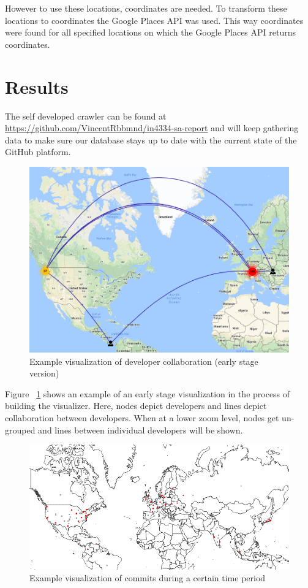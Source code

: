\documentclass[acmtog, authorversion]{acmart}
\begin{document}
However to use these locations, coordinates are needed. 
To transform these locations to coordinates the Google Places API was used. 
This way coordinates were found for all specified locations on which the Google Places API returns coordinates.

\section{Results}
The self developed crawler can be found at \url{https://github.com/VincentRbbmnd/in4334-sa-report} and will keep gathering data to make sure our database stays up to date with the current state of the GitHub platform.

\begin{figure}
\includegraphics[scale=0.3]{visualizer-example.PNG} 
\caption{Example visualization of developer collaboration (early stage version)}
\label{fig:collaboration}
\end{figure}

Figure ~\ref{fig:collaboration} shows an example of an early stage visualization in the process of building the visualizer.
Here, nodes depict developers and lines depict collaboration between developers.
When at a lower zoom level, nodes get un-grouped and lines between individual developers will be shown.

\begin{figure}
\includegraphics[scale=0.4]{d3-example-rails.PNG} 
\caption{Example visualization of commits during a certain time period}
\label{fig:commits-period}
\end{figure}
\end{document}
